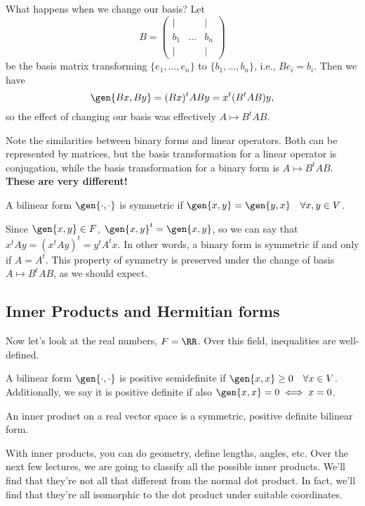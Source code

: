 What happens when we change our basis? Let 
\[B = \begin{pmatrix}
    \vert & & \vert \\
    b_1   & \hdots & b_n   \\
    \vert & & \vert
\end{pmatrix}\]
be the basis matrix transforming $\{e_1, \hdots, e_n\}$ to $\{b_1, \hdots, b_n\}$, i.e., $Be_i = b_i$. Then we have 
\[\gen{Bx, By} = (Bx)^tABy = x^t(B^tAB)y,\] 
so the effect of changing our basis was effectively $A\mapsto B^tAB$. 

Note the similarities between binary forms and linear operators. Both can be represented by matrices, but the basis transformation for a linear operator is conjugation, while the basis transformation for a binary form is $A\mapsto B^tAB$. \textbf{These are very different!}

\begin{definition}

A bilinear form $\gen{\cdot, \cdot}$ is \ac{symmetric} if $\gen{x,y} = \gen{y,x}\quad \forall x,y\in V$. 
\end{definition}

Since $\gen{x,y} \in F$, $\gen{x,y}^t = \gen{x,y}$, so we can say that
$x^tAy = (x^tAy)^t = y^tA^tx$. In other words, a binary form is symmetric if and only if $A = A^t$. This property of symmetry is preserved under the change of basis $A\mapsto B^tAB$, as we should expect.

\subsection{Inner Products and Hermitian forms}

Now let's look at the real numbers, $F = \RR$. Over this field, inequalities are well-defined.
\begin{definition}

A bilinear form $\gen{\cdot,\cdot}$ is \ac{positive semidefinite} if $\gen{x,x} \geq 0\quad \forall x\in V$. Additionally, we say it is \ac{positive definite} if also $\gen{x,x}=0\iff x=0$. 
\end{definition}

\begin{definition}

An \ac{inner product} on a real vector space is a symmetric, positive definite bilinear form. 
\end{definition}

With inner products, you can do geometry, define lengths, angles, etc. Over the next few lectures, we are going to classify all the possible inner products. We'll find that they're not all that different from the normal dot product. In fact, we'll find that they're all isomorphic to the dot product under suitable coordinates.

